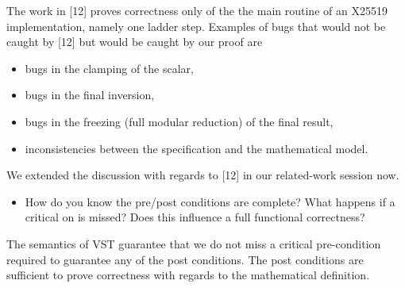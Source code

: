 \begin{answer}
    The work in [12] proves correctness only of the the main routine of an X25519
    implementation, namely one ladder step. Examples of bugs that would not be
    caught by [12] but would be caught by our proof are
    \begin{itemize}
        \item bugs in the clamping of the scalar,
        \item bugs in the final inversion,
        \item bugs in the freezing (full modular reduction) of the final result,
        \item inconsistencies between the specification and the mathematical model.
    \end{itemize}
    We extended the discussion with regards to [12] in our related-work session now.
\end{answer}

\begin{center}
\end{center}

\begin{itemize}
    \item How do you know the pre/post conditions are complete? What happens if a critical on is missed? Does this influence a full functional correctness?
\end{itemize}

\begin{answer}
    The semantics of VST guarantee that we do not miss a critical pre-condition
    required to guarantee any of the post conditions. The post conditions are
    sufficient to prove correctness with regards to the mathematical definition.
\end{answer}
